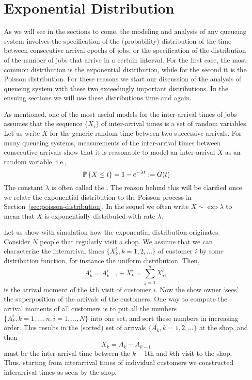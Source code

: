 \section{Exponential Distribution}
\label{sec:expon-distr}
As we will see in the sections to come, the modeling and analysis of
any queueing system involves the specification of the (probability)
distribution of the time between consecutive arrival epochs of jobs,
or the specification of the distribution of the number of jobs that
arrive in a certain interval.  For the first case, the most common
distribution is the exponential distribution, while for the second it
is the Poisson distribution.  For these reasons we start our
discussion of the analysis of queueing system with these two
exceedingly important distributions. In the ensuing sections we will
use these distributions time and again.

As mentioned, one of the most useful models for the inter-arrival
times of jobs assumes that the sequence $\{X_i\}$ of inter-arrival
times is a set of   random variables.  Let us write $X$ for the generic
random time between two successive arrivals. For many queueing
systems, measurements of the inter-arrival times between consecutive
arrivals show that it is reasonable to model an inter-arrival $X$ as
an  random variable, i.e.,
\begin{equation*}
  \P{X \leq t} = 1- e^{-\lambda t} := G(t)
\end{equation*}
The constant $\lambda$ is often called the . The reason
behind this will be clarified once we relate the exponential
distribution to the Poisson process in
Section~\ref{sec:poisson-distribution}.  In the sequel we often write $X\sim \exp{\lambda}$ to mean that $X$ is exponentially distributed with rate $\lambda$. 


Let us show with simulation how the exponential distribution
originates. Consider $N$ people that regularly visit a shop. We assume
that we can characterize the interarrival times
$\{X_k^i, k=1,2, \ldots\}$ of customer $i$ by some distribution
function, for instance the uniform distribution. Then,
\begin{equation*}
A_k^i = A_{k-1}^i + X_k^i = \sum_{j=1}^n X_j^i,
\end{equation*}
is the arrival moment of the $k$th visit of customer $i$.  Now the
show owner `sees' the superposition of the arrivals of the
customers. One way to compute the arrival moments of all customers is
to put all the numbers $\{A_k^i, k=1,\ldots,n, i=1,\ldots,N\}$ into
one set, and sort these numbers in increasing order. This results in
the (sorted) set of arrivals $\{A_k, k=1,2,\ldots\}$ at the shop, and
then
\begin{equation*}
X_k = A_k - A_{k-1}
\end{equation*}
must be the inter-arrival time between the $k-1$th and $k$th visit to
the shop.  Thus, starting from interarrival times of individual
customers we constructed interarrival times as seen by the shop. 

